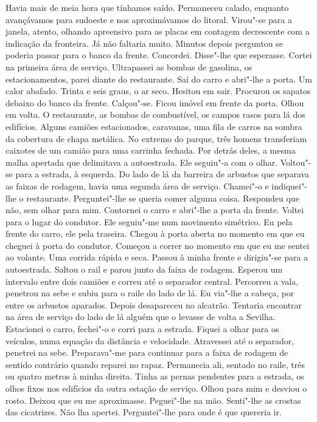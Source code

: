 Havia mais de meia hora que tínhamos saído. Permaneceu calado, enquanto
avançávamos para sudoeste e nos aproximávamos do litoral. Virou"-se para
a janela, atento, olhando apreensivo para as placas em contagem
decrescente com a indicação da fronteira. Já não faltaria muito. Minutos
depois perguntou se poderia passar para o banco da frente. Concordei.
Disse"-lhe que esperasse. Cortei na primeira área de serviço.
Ultrapassei as bombas de gasolina, os estacionamentos, parei diante do
restaurante. Saí do carro e abri"-lhe a porta. Um calor abafado. Trinta
e seis graus, o ar seco. Hesitou em sair. Procurou os sapatos debaixo do
banco da frente. Calçou"-se. Ficou imóvel em frente da porta. Olhou em
volta. O restaurante, as bombas de combustível, os campos rasos para lá
dos edifícios. Alguns camiões estacionados, caravanas, uma fila de
carros na sombra da cobertura de chapa metálica. No extremo do parque,
três homens transferiam caixotes de um camião para uma carrinha fechada.
Por detrás deles, a mesma malha apertada que delimitava a autoestrada.
Ele seguiu"-a com o olhar. Voltou"-se para a estrada, à esquerda. Do
lado de lá da barreira de arbustos que separava as faixas de rodagem,
havia uma segunda área de serviço. Chamei"-o e indiquei"-lhe o
restaurante. Perguntei"-lhe se queria comer alguma coisa. Respondeu que
não, sem olhar para mim. Contornei o carro e abri"-lhe a porta da
frente. Voltei para o lugar do condutor. Ele seguiu"-me num movimento
simétrico. Eu pela frente do carro, ele pela traseira. Chegou à porta
aberta no momento em que eu cheguei à porta do condutor. Começou a
correr no momento em que eu me sentei ao volante. Uma corrida rápida e
seca. Passou à minha frente e dirigiu"-se para a autoestrada. Saltou o
rail e parou junto da faixa de rodagem. Esperou um intervalo entre dois
camiões e correu até o separador central. Percorreu a vala, penetrou na
sebe e subiu para o raile do lado de lá. Eu via"-lhe a cabeça, por entre
os arbustos aparados. Depois desapareceu no alcatrão. Tentaria encontrar
na área de serviço do lado de lá alguém que o levasse de volta a
Sevilha. Estacionei o carro, fechei"-o e corri para a estrada. Fiquei a
olhar para os veículos, numa equação da distância e velocidade.
Atravessei até o separador, penetrei na sebe. Preparava"-me para
continuar para a faixa de rodagem de sentido contrário quando reparei no
rapaz. Permanecia ali, sentado no raile, três ou quatro metros à minha
direita. Tinha as pernas pendentes para a estrada, os olhos fixos nos
edifícios da outra estação de serviço. Olhou para mim e desviou o rosto.
Deixou que eu me aproximasse. Peguei"-lhe na mão. Senti"-lhe as crostas
das cicatrizes. Não lha apertei. Perguntei"-lhe para onde é que quereria
ir.

